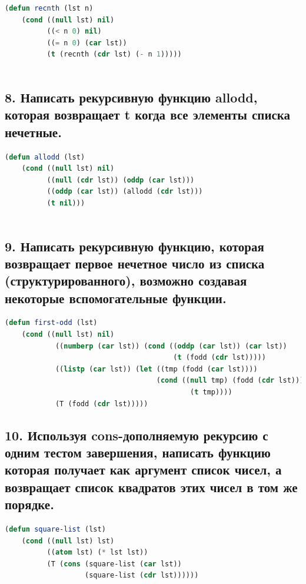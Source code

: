 \documentclass[12pt]{report}
\begin{document}
\begin{lstlisting}[label=6xd, caption=Решение задания №7, language=lisp]	
(defun recnth (lst n) 
	(cond ((null lst) nil) 
		  ((< n 0) nil) 
		  ((= n 0) (car lst)) 
		  (t (recnth (cdr lst) (- n 1)))))
	
\end{lstlisting}

\subsection*{8. Написать рекурсивную функцию allodd, которая возвращает t когда все элементы списка
	нечетные.}

\begin{lstlisting}[label=6xd, caption=Решение задания №8, language=lisp]
(defun allodd (lst) 
	(cond ((null lst) nil) 
		  ((null (cdr lst)) (oddp (car lst))) 
		  ((oddp (car lst)) (allodd (cdr lst))) 
		  (t nil)))
	
\end{lstlisting}

\subsection*{9. Написать рекурсивную функцию, которая возвращает первое нечетное число из списка
	(структурированного), возможно создавая некоторые вспомогательные функции.}

\begin{lstlisting}[label=6xd, caption=Решение задания №9, language=lisp]
(defun first-odd (lst)
	(cond ((null lst) nil) 
			((numberp (car lst)) (cond ((oddp (car lst)) (car lst)) 
										(t (fodd (cdr lst)))))
			((listp (car lst)) (let ((tmp (fodd (car lst)))) 
									(cond ((null tmp) (fodd (cdr lst))) 
											(t tmp))))
			(T (fodd (cdr lst)))))

\end{lstlisting}

\subsection*{10. Используя cons-дополняемую рекурсию с одним тестом завершения,
	написать функцию которая получает как аргумент список чисел, а возвращает список
	квадратов этих чисел в том же порядке.}

\begin{lstlisting}[label=6xd, caption=Решение задания №10, language=lisp]
(defun square-list (lst)
	(cond ((null lst) lst)
		  ((atom lst) (* lst lst))
		  (T (cons (square-list (car lst))
				   (square-list (cdr lst))))))
	
\end{lstlisting}
\end{document}
